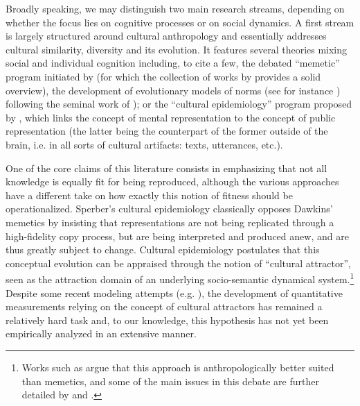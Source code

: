 Broadly speaking, we may distinguish two main research streams, depending on whether the focus lies on cognitive processes or on social dynamics. A first stream is largely structured around cultural anthropology and essentially addresses cultural similarity, diversity and its evolution. It features several theories mixing social and individual cognition including, to cite a few, the debated ``memetic'' program initiated by \citet{Dawkins76} (for which the collection of works by \citet{Aunger00} provides a solid overview), the development of evolutionary models of norms (see for instance \citet{Ehrlich05}) following the seminal work of \citet{Boyd85}); or the ``cultural epidemiology'' program proposed by \citet{sper:expl}, which links the concept of mental representation to the concept of public representation (the latter being the counterpart of the former outside of the brain, \hbox{i.e.} in all sorts of cultural artifacts: texts, utterances, etc.).

One of the core claims of this literature consists in emphasizing that not all knowledge is equally fit for being reproduced, although the various approaches have a different take on how exactly this notion of fitness should be operationalized. Sperber's cultural epidemiology classically opposes Dawkins' memetics by insisting that representations are not being replicated through a high-fidelity copy process, but are being interpreted and produced anew, and are thus greatly subject to change.
Cultural epidemiology postulates that this conceptual evolution can be appraised through the notion of ``cultural attractor'', seen as the attraction domain of an underlying socio-semantic dynamical system.\footnote{Works such as \citet{Atran03} argue that this approach is anthropologically better suited than memetics, and some of the main issues in this debate are further detailed by \citet{Kuper00} and \citet{Bloch00}.}
Despite some recent modeling attempts (\hbox{e.g.} \citet{Claidiere07}), the development of quantitative measurements relying on the concept of cultural attractors has remained a relatively hard task and, to our knowledge, this hypothesis has not yet been empirically analyzed in an extensive manner.


